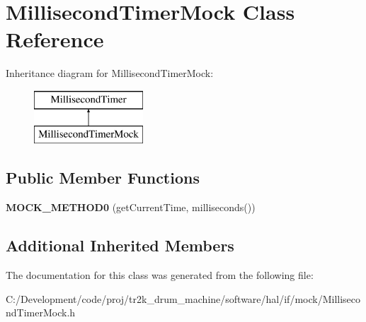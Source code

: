 \hypertarget{class_millisecond_timer_mock}{}\section{Millisecond\+Timer\+Mock Class Reference}
\label{class_millisecond_timer_mock}
Inheritance diagram for Millisecond\+Timer\+Mock\+:\begin{figure}[H]
\begin{center}
\leavevmode
\includegraphics[height=2.000000cm]{class_millisecond_timer_mock}
\end{center}
\end{figure}
\subsection*{Public Member Functions}
\begin{DoxyCompactItemize}
\item 
\mbox{\label{class_millisecond_timer_mock_a571ee8d72b3a6285c6ddc31e63cb642b}} 
{\bfseries M\+O\+C\+K\+\_\+\+M\+E\+T\+H\+O\+D0} (get\+Current\+Time, milliseconds())
\end{DoxyCompactItemize}
\subsection*{Additional Inherited Members}


The documentation for this class was generated from the following file\+:\begin{DoxyCompactItemize}
\item 
C\+:/\+Development/code/proj/tr2k\+\_\+drum\+\_\+machine/software/hal/if/mock/Millisecond\+Timer\+Mock.\+h\end{DoxyCompactItemize}
